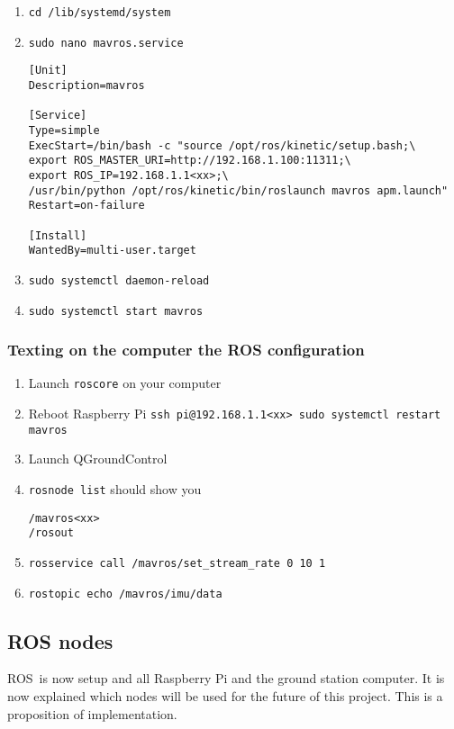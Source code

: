 \begin{enumerate}
    \item \texttt{cd /lib/systemd/system}
    \item \texttt{sudo nano mavros.service}
          \begin{verbatim}
[Unit]
Description=mavros

[Service]
Type=simple
ExecStart=/bin/bash -c "source /opt/ros/kinetic/setup.bash;\
export ROS_MASTER_URI=http://192.168.1.100:11311;\
export ROS_IP=192.168.1.1<xx>;\
/usr/bin/python /opt/ros/kinetic/bin/roslaunch mavros apm.launch"
Restart=on-failure

[Install]
WantedBy=multi-user.target
                    \end{verbatim}
    \item \texttt{sudo systemctl daemon-reload}
    \item \texttt{sudo systemctl start mavros}
\end{enumerate}

\subsubsection{Texting on the computer the ROS configuration}
\begin{enumerate}
    \item Launch \texttt{roscore} on your computer
    \item Reboot Raspberry Pi \texttt{ssh pi@192.168.1.1<xx> sudo systemctl restart mavros}
    \item Launch QGroundControl
    \item \texttt{rosnode list} should show you

          \begin{verbatim}
/mavros<xx>
/rosout
          \end{verbatim}
    \item \texttt{rosservice call /mavros/set\_stream\_rate 0 10 1}
    \item \texttt{rostopic echo /mavros/imu/data}
\end{enumerate}

\subsection{ROS nodes}
ROS is now setup and all Raspberry Pi and the ground station computer.
It is now explained which nodes will be used for the future of this project.
This is a proposition of implementation.

